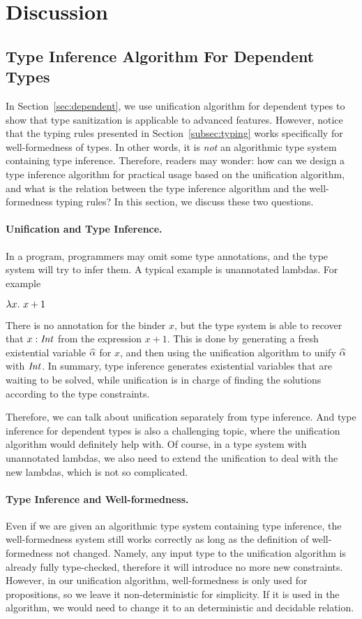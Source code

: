 \section{Discussion}

\subsection{Type Inference Algorithm For Dependent Types}

In Section~\ref{sec:dependent}, we use unification algorithm for dependent types
to show that type sanitization is applicable to advanced features. However,
notice that the typing rules presented in Section~\ref{subsec:typing} works
specifically for well-formedness of types. In other words, it is \textit{not} an
algorithmic type system containing type inference. Therefore, readers may wonder:
how can we design a type inference algorithm for practical usage based on the
unification algorithm, and what is the relation between the type inference
algorithm and the well-formedness typing rules? In this section, we discuss
these two questions.

\paragraph{Unification and Type Inference.} In a program, programmers may omit
some type annotations, and the type system will try to infer them. A typical
example is unannotated lambdas. For example

$\lambda {x}.~ {x + 1} $

There is no annotation for the binder $x$, but the type system is able to
recover that $x:\mathit{Int}$ from the expression $x + 1$. This is done by generating a
fresh existential variable $\widehat{\alpha}$ for $x$, and then using the unification
algorithm to unify $\widehat{\alpha}$ with $\mathit{Int}$. In summary, type inference generates
existential variables that are waiting to be solved, while unification is in
charge of finding the solutions according to the type constraints.

Therefore, we can talk about unification separately from type inference. And
type inference for dependent types is also a challenging topic, where the
unification algorithm would definitely help with. Of course, in a type system
with unannotated lambdas, we also need to extend the unification to deal with
the new lambdas, which is not so complicated.

\paragraph{Type Inference and Well-formedness.} Even if we are given an
algorithmic type system containing type inference, the well-formedness system
still works correctly as long as the definition of well-formedness not changed.
Namely, any input type to the unification algorithm is already fully
type-checked, therefore it will introduce no more new constraints. However,
in our unification algorithm, well-formedness is only used for propositions,
so we leave it non-deterministic for simplicity. If it is used in the
algorithm, we would need to change it to an deterministic and decidable
relation.

